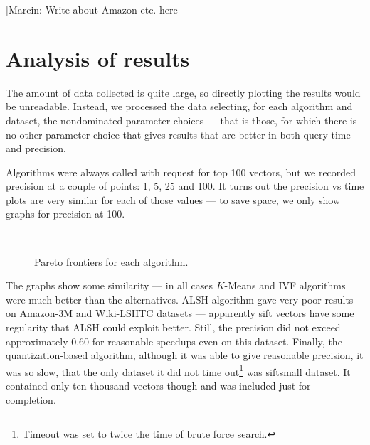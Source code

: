 [Marcin: Write about Amazon etc. here]



\section{Analysis of results}

The amount of data collected is quite large, so directly plotting the results would be
unreadable. Instead, we processed the data selecting, for each algorithm and dataset,
the nondominated parameter choices --- that is those, for which there is no other
parameter choice that gives results that are better in both query time and precision.

Algorithms were always called with request for top 100 vectors, but we recorded
precision at a couple of points: 1, 5, 25 and 100. It turns out the precision vs time
plots are very similar for each of those values --- to save space, we only show
graphs for precision at 100.


\begin{figure}[H]
	\centering
	\\
\caption{Pareto frontiers for each algorithm.}
\end{figure}

The graphs show some similarity --- in all cases $K$-Means and IVF algorithms were much better
than the alternatives. ALSH algorithm gave very poor results on Amazon-3M and Wiki-LSHTC
datasets --- apparently sift vectors have some regularity that ALSH could exploit better.
Still, the precision did not exceed approximately $0.60$ for reasonable speedups even on
this dataset. Finally, the quantization-based algorithm, although it was able to give
reasonable precision, it was so slow, that the only dataset it did not time 
out\footnote{Timeout was set to twice the time of brute force search.}
was siftsmall dataset. It contained only ten thousand vectors though and was included
just for completion.

